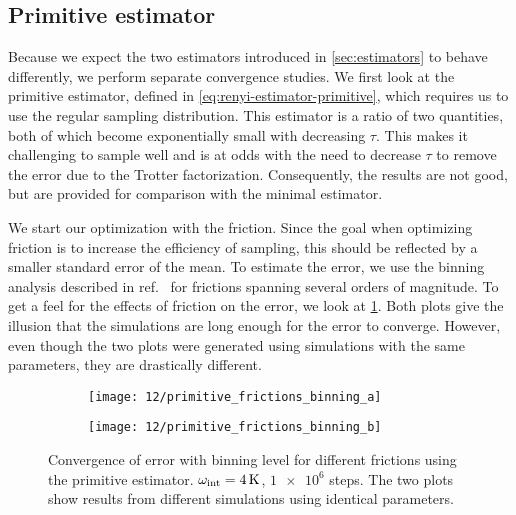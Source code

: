 \subsection{Primitive estimator}

Because we expect the two estimators introduced in \cref{sec:estimators} to behave differently, we perform separate convergence studies.
We first look at the primitive estimator, defined in \vref{eq:renyi-estimator-primitive}, which requires us to use the regular sampling distribution.
This estimator is a ratio of two quantities, both of which become exponentially small with decreasing $\tau$.
This makes it challenging to sample well and is at odds with the need to decrease $\tau$ to remove the error due to the Trotter factorization.
Consequently, the results are not good, but are provided for comparison with the minimal estimator.

We start our optimization with the friction.
Since the goal when optimizing friction is to increase the efficiency of sampling, this should be reflected by a smaller standard error of the mean.
To estimate the error, we use the binning analysis described in ref.~\cite{ambegaokar2010estimating} for frictions spanning several orders of magnitude.
To get a feel for the effects of friction on the error, we look at \cref{fig:primitive-frictions-binning}.
Both plots give the illusion that the simulations are long enough for the error to converge.
However, even though the two plots were generated using simulations with the same parameters, they are drastically different.

\begin{figure}
	\setlength{\figspacing}{5 mm}
	\centering
	\begin{subfigure}[b]{\textwidth}
		\texttt{[image: 12/primitive\_frictions\_binning\_a]}
		\caption{}
		\vspace{\figspacing}
	\end{subfigure}
	\begin{subfigure}[b]{\textwidth}
		\texttt{[image: 12/primitive\_frictions\_binning\_b]}
		\caption{}
	\end{subfigure}
	\caption[
		Error convergence for primitive estimator
	]{
		Convergence of error with binning level for different frictions using the primitive estimator.
		$\omega_\text{int} = \SI{4}{\kelvin}$, $\num{1e6}$ steps.
		The two plots show results from different simulations using identical parameters.
	}
	\label{fig:primitive-frictions-binning}
\end{figure}


